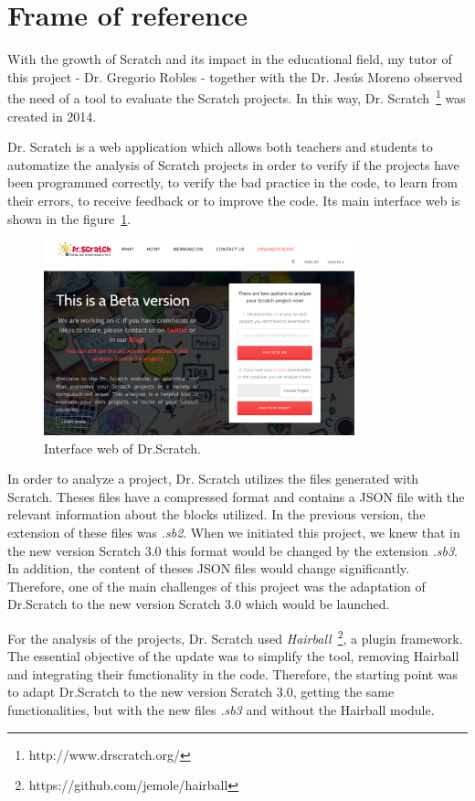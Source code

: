 \section{Frame of reference}
\label{sec:reference}

With the growth of Scratch and its impact in the educational field, my tutor of this project - Dr. Gregorio Robles - together with the Dr. Jesús Moreno observed the need of a tool to evaluate the Scratch projects. In this way, Dr. Scratch~\footnote{http://www.drscratch.org/} was created in 2014.

Dr. Scratch is a web application which allows both teachers and students to automatize the analysis of Scratch projects in order to verify if the projects have been programmed correctly, to verify the bad practice in the code, to learn from their errors, to receive feedback or to improve the code. Its main interface web is shown in the figure~\ref{fig:dr_scratch}.

\begin{figure}
  \centering
  \includegraphics[width=9cm, keepaspectratio]{img/dr_scratch.png}
  \caption{Interface web of Dr.Scratch.}
  \label{fig:dr_scratch}
\end{figure}

In order to analyze a project, Dr. Scratch utilizes the files generated with Scratch. Theses files have a compressed format and contains a JSON file with the relevant information about the blocks utilized. In the previous version, the extension of these files was \textit{.sb2}. When we initiated this project, we knew that in the new version Scratch 3.0 this format would be changed by the extension \textit{.sb3}. In addition, the content of theses JSON files would change significantly. Therefore, one of the main challenges of this project was the adaptation of Dr.Scratch to the new version Scratch 3.0 which would be launched. 

For the analysis of the projects, Dr. Scratch used \textit{Hairball}~\footnote{https://github.com/jemole/hairball}, a plugin framework. The essential objective of the update was to simplify the tool, removing Hairball and integrating their functionality in the code. Therefore, the starting point was to adapt Dr.Scratch to the new version Scratch 3.0, getting the same functionalities, but with the new files \textit{.sb3} and without the Hairball module.

